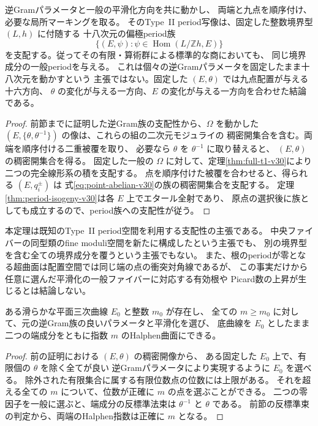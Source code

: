 \begin{theorem}[元の族の境界period支配性]
\label{thm:boundary-period-dominance-v30}
逆Gramパラメータと一般の平滑化方向を共に動かし、
両端と九点を順序付け、必要な局所マーキングを取る。
そのType~II period写像は、固定した整数境界型 $(L,h)$ に付随する
十八次元の偏極period族
\[
 \{(E,\psi):\psi\in\operatorname{Hom}(L/\mathbb Zh,E)\}
\]
を支配する。従ってその有限・算術群による標準的な商においても、
同じ境界成分の一般periodを与える。
これは個々の逆Gramパラメータを固定したまま十八次元を動かすという
主張ではない。固定した $(E,\theta)$ では九点配置が与える十六方向、
$\theta$ の変化が与える一方向、$E$ の変化が与える一方向を合わせた結論である。
\end{theorem}

\begin{proof}
前節までに証明した逆Gram族の支配性から、$\Omega$ を動かした
$(E,\{\theta,\theta^{-1}\})$ の像は、これらの組の二次元モジュライの
稠密開集合を含む。両端を順序付ける二重被覆を取り、
必要なら $\theta$ を $\theta^{-1}$ に取り替えると、
$(E,\theta)$ の稠密開集合を得る。
固定した一般の $\Omega$ に対して、定理\ref{thm:full-t1-v30}により
二つの完全線形系の積を支配する。
点を順序付けた被覆を合わせると、得られる $(E,q_i^\pm)$ は
式\eqref{eq:point-abelian-v30}の族の稠密開集合を支配する。
定理\ref{thm:period-isogeny-v30}は各 $E$ 上でエタール全射であり、
原点の選択後に族としても成立するので、period族への支配性が従う。
\end{proof}

\begin{remark}[モジュライに関して証明した範囲]
本定理は既知のType~II period空間を利用する支配性の主張である。
中央ファイバーの同型類のfine moduli空間を新たに構成したという主張でも、
別の境界型を含む全ての境界成分を覆うという主張でもない。
また、根のperiodが零となる超曲面は配置空間では同じ端の点の衝突対角線であるが、
この事実だけから任意に選んだ平滑化の一般ファイバーに対応する有効根や
Picard数の上昇が生じるとは結論しない。
\end{remark}

\begin{corollary}[十分大きい全てのHalphen指数]
\label{cor:cofinite-halphen-v30}
ある滑らかな平面三次曲線 $E_0$ と整数 $m_0$ が存在し、
全ての $m\ge m_0$ に対して、元の逆Gram族の良いパラメータと平滑化を選び、
底曲線を $E_0$ としたまま二つの端成分をともに指数 $m$ のHalphen曲面にできる。
\end{corollary}

\begin{proof}
前の証明における $(E,\theta)$ の稠密開像から、
ある固定した $E_0$ 上で、有限個の $\theta$ を除く全てが良い
逆Gramパラメータにより実現するように $E_0$ を選べる。
除外された有限集合に属する有限位数点の位数には上限がある。
それを超える全ての $m$ について、位数が正確に $m$ の点を選ぶことができる。
二つの零因子を一般に選ぶと、端成分の反標準法束は
$\theta^{-1}$ と $\theta$ である。
前節の反標準束の判定から、両端のHalphen指数は正確に $m$ となる。
\end{proof}

